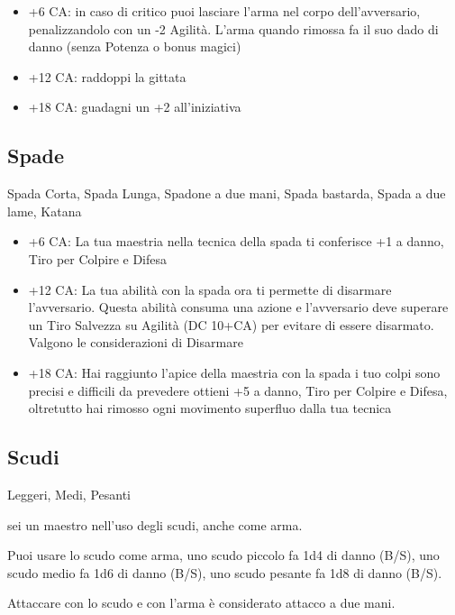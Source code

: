 \documentclass[a4paper,11pt,twoside,openany]{book}
\begin{document}
\begin{itemize}

	\item +6 CA: in caso di critico puoi lasciare l'arma nel corpo dell'avversario,
	      penalizzandolo con un -2 Agilità. L'arma quando rimossa fa il suo dado di danno (senza Potenza o bonus magici)

	\item +12 CA: raddoppi la gittata

	\item +18 CA: guadagni un +2 all'iniziativa
\end{itemize}

\subsection{Spade} Spada Corta, Spada Lunga, Spadone a due mani, Spada bastarda, Spada a due lame, Katana

\begin{itemize}

	\item +6 CA: La tua maestria nella tecnica della spada ti conferisce +1 a danno, Tiro per Colpire e Difesa

	\item +12 CA: La tua abilità con la spada ora ti permette di disarmare l'avversario. Questa abilità consuma una azione e l'avversario deve superare un Tiro Salvezza su Agilità (DC 10+CA) per evitare di essere disarmato. Valgono le considerazioni di Disarmare

	\item +18 CA: Hai raggiunto l'apice della maestria con la spada i tuo colpi sono precisi e difficili da prevedere ottieni +5 a danno, Tiro per Colpire e Difesa, oltretutto hai rimosso ogni movimento superfluo dalla tua tecnica
\end{itemize}

\subsection{Scudi} Leggeri, Medi, Pesanti

sei un maestro nell'uso degli scudi, anche come arma.

Puoi usare lo scudo come arma, uno scudo piccolo fa 1d4 di danno (B/S), uno scudo medio fa 1d6 di danno (B/S), uno scudo pesante fa 1d8 di danno (B/S).

Attaccare con lo scudo e con l'arma è considerato attacco a due mani.
\end{document}
